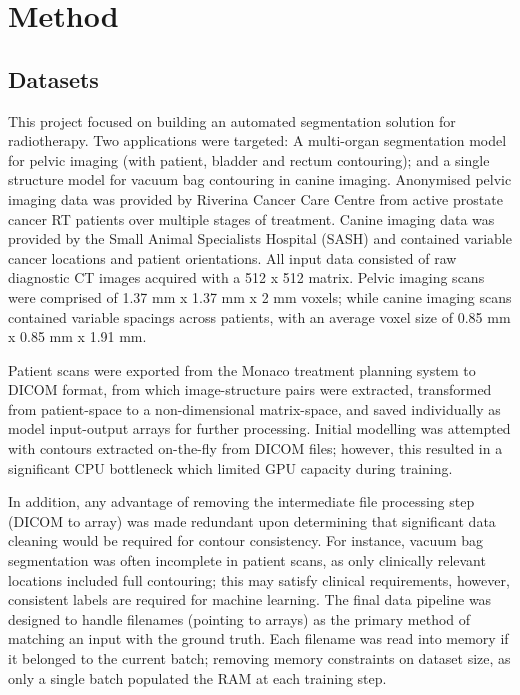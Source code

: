 \chapter{Method}
\label{ch:method}

\section{Datasets}
\label{ch:method-dataset} This project focused on building an automated
segmentation solution for radiotherapy. Two applications were targeted: A
multi-organ segmentation model for pelvic imaging (with patient, bladder and
rectum contouring); and a single structure model for vacuum bag contouring in
canine imaging. Anonymised pelvic imaging data was provided by Riverina Cancer
Care Centre from active prostate cancer RT patients over multiple stages of
treatment. Canine imaging data was provided by the Small Animal Specialists
Hospital (SASH) and contained variable cancer locations and patient
orientations. All input data consisted of raw diagnostic CT images acquired with
a 512 x 512 matrix. Pelvic imaging scans were comprised of 1.37 mm x 1.37 mm x 2
mm voxels; while canine imaging scans contained variable spacings across
patients, with an average voxel size of 0.85 mm x 0.85 mm x 1.91 mm.

Patient scans were exported from the Monaco treatment planning system to DICOM
format, from which image-structure pairs were extracted, transformed from
patient-space to a non-dimensional matrix-space, and saved individually as model
input-output arrays for further processing. Initial modelling was attempted with
contours extracted on-the-fly from DICOM files; however, this resulted in a
significant CPU bottleneck which limited GPU capacity during training.

In addition, any advantage of removing the intermediate file processing step
(DICOM to array) was made redundant upon determining that significant data
cleaning would be required for contour consistency. For instance, vacuum bag
segmentation was often incomplete in patient scans, as only clinically relevant
locations included full contouring; this may satisfy clinical requirements,
however, consistent labels are required for machine learning. The final data
pipeline was designed to handle filenames (pointing to arrays) as the primary
method of matching an input with the ground truth. Each filename was read into
memory if it belonged to the current batch; removing memory constraints on
dataset size, as only a single batch populated the RAM at each training step.


